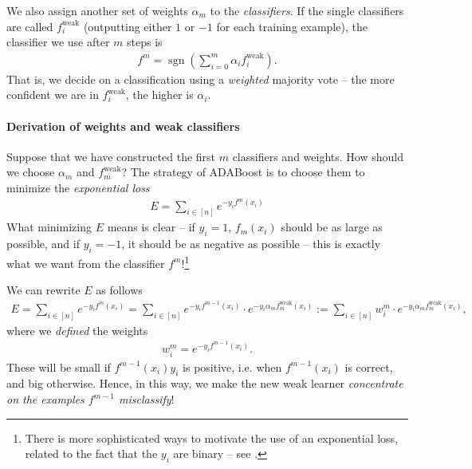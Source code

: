 \documentclass{article}
\DeclareMathOperator{\sgn}{sgn}
\newcommand{\weak}{\mathrm{weak}}
\begin{document}
We also assign another set of weights $\alpha_m$ to the \emph{classifiers}. If the single classifiers are called $f_i^\weak$ (outputting either $1$ or $-1$ for each training example), the  classifier we use after $m$ steps is
\begin{align*}
    f^m = \sgn\left(\sum_{i=0}^m \alpha_i f_i^\weak\right).
\end{align*}
That is, we decide on a classification using a \emph{weighted} majority vote -- the more confident we are in $f_i^\weak$, the higher is $\alpha_i$.

\paragraph{Derivation of weights and weak classifiers} Suppose that we have constructed the first $m$ classifiers and weights. How should we choose $\alpha_m$ and $f_m^\weak$? The strategy of ADABoost is to choose them to minimize the \emph{exponential loss}
\begin{align} \label{eq:err}
    E = \sum_{i\in[n]} e^{-y_if^m(x_i)}
\end{align}
What minimizing $E$ means is clear -- if $y_i=1$, $f_m(x_i)$ should be as large as possible, and if $y_i=-1$, it should be as negative as possible -- this is exactly what we want from the classifier $f^m$!\footnote{There is  more sophisticated ways to motivate the use of an exponential loss, related to the fact that the $y_i$ are binary  -- see \cite[Chapter 10]{hastieElements}.} \newline

We can rewrite $E$ as follows
\begin{align*}
     E= \sum_{i\in[n]} e^{-y_if^m(x_i)} = \sum_{i\in [n]}e^{-y_if^{m-1}(x_i)} \cdot e^{-y_i\alpha_m f_m^{\weak}(x_i)}:= \sum_{i\in [n]}w_i^m \cdot e^{-y_i\alpha_m f_m^{\weak}(x_i)},
\end{align*}
where we \emph{defined} the weights
\begin{align} \label{eq:weights}
    w_i^m = e^{-y_if^{m-1}(x_i)}.
\end{align}
These will be small if $f^{m-1}(x_i)y_i$ is positive, i.e. when $f^{m-1}(x_i)$ is correct, and big otherwise. Hence, in this way, we make the new weak learner \emph{concentrate on the examples $f^{m-1}$ misclassify}!
\end{document}
